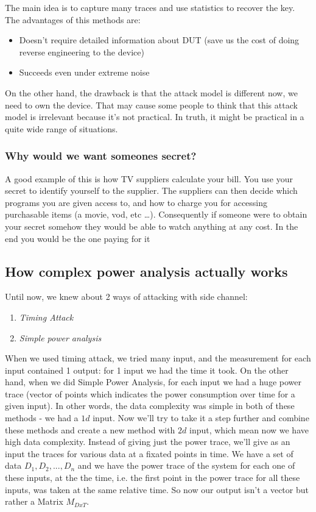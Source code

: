 The main idea is to capture many traces and use statistics to recover the key.
The advantages of this methods are:
\begin{itemize}
    \item Doesn't require detailed information about DUT (save us the cost of
    doing reverse engineering to the device)
    \item Succeeds even under extreme noise
\end{itemize}

On the other hand, the drawback is that the attack model is different now, we
need to own the device. That may cause some people to think that this attack
model is irrelevant because it's not practical. In truth, it might be practical
in a quite wide range of situations.

\subsubsection{Why would we want someones secret?}

A good example of this is how TV suppliers calculate your bill.
You use your secret to identify yourself to the supplier. The suppliers can then decide which programs you are given access to, and how to charge you for accessing purchasable items (a movie, vod, etc \ldots). 
Consequently if someone were to obtain your secret somehow they would be able to watch anything at any cost. In the end you would be the one paying for it

\subsection{How complex power analysis actually works}

Until now, we knew about 2 ways of attacking with side channel:
\begin{enumerate}
    \item \textit{Timing Attack}
    \item \textit{Simple power analysis}
\end{enumerate}

When we used timing attack, we tried many input, and the measurement for each
input contained 1 output: for 1 input we had the time it took. On the other
hand, when we did Simple Power Analysis, for each input we had a huge power
trace (vector of points which indicates the power consumption over time for a
given input). In other words, the data complexity was simple in both of these
methods - we had a $1d$ input. Now we'll try to take it a step further and
combine these methods and create a new method with $2d$ input, which mean now we
have high data complexity. Instead of giving just the power trace, we'll give as
an input the traces for various data at a fixated points in time. We have a set
of data ${D_1, D_2, ..., D_n}$ and we have the power trace of the system for
each one of these inputs, at the the time, i.e. the first point in the power
trace for all these inputs, was taken at the same relative time. So now our
output isn't a vector but rather a Matrix $M_{DxT}$.

